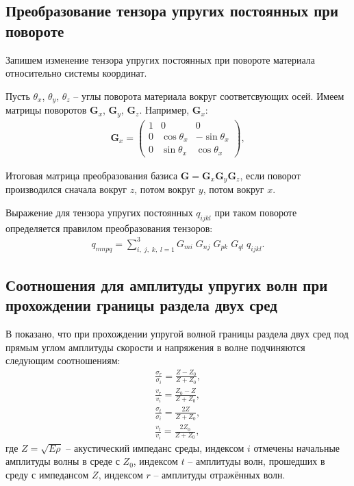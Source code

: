 \subsection{Преобразование тензора упругих постоянных при повороте}
Запишем изменение тензора упругих постоянных при повороте материала относительно системы координат.

Пусть $\theta_{x}$, $\theta_{y}$, $\theta_{z}$ -- углы поворота материала вокруг соответсвующих осей.
Имеем матрицы поворотов $\mathbf{G}_x$, $\mathbf{G}_y$, $\mathbf{G}_z$. Например, $\mathbf{G}_x$:
\begin{align}
\mathbf{G}_x =
\left( \begin{array}{cccccccccccc}
1 & 0 & 0 \\ 
0 & \cos \theta_{x} & -\sin \theta_{x} \\ 
0 & \sin \theta_{x} & \cos \theta_{x}
\end{array} \right),
\end{align}

Итоговая матрица преобразования базиса $\mathbf{G} = \mathbf{G}_{x}\mathbf{G}_{y}\mathbf{G}_{z}$, если поворот производился сначала вокруг $z$, потом вокруг $y$, потом вокруг $x$.

Выражение для тензора упругих постоянных $q_{ijkl}$ при таком повороте определяется правилом преобразования тензоров:
\begin{align}
	q_{mnpq} = \sum_{i,\;j,\;k,\;l = 1}^{3} G_{mi}\;G_{nj}\;G_{pk}\;G_{ql}\;q_{ijkl}.
\end{align}


\subsection{Соотношения для амплитуды упругих волн при прохождении границы раздела двух сред}
\label{analytical_amplitudes}
В \cite{akhmadeev} показано, что при прохождении упругой волной границы раздела двух сред под прямым углом амплитуды скорости и напряжения в волне подчиняются следующим соотношениям:
\begin{eqnarray}
\frac{\sigma_r}{\sigma_i} = \frac{Z - Z_0}{Z + Z_0}, \\
\frac{v_r}{v_i} = \frac{Z_0 - Z}{Z + Z_0}, \\
\frac{\sigma_t}{\sigma_i} = \frac{2Z}{Z + Z_0}, \\
\frac{v_t}{v_i} = \frac{2Z_0}{Z + Z_0},
\end{eqnarray}
где $Z = \sqrt{E\rho}$ -- акустический импеданс среды, индексом $i$ отмечены начальные амплитуды волны в среде с $Z_0$, индексом $t$ -- амплитуды волн, прошедших в среду с импедансом $Z$, индексом $r$ -- амплитуды отражённых волн.





